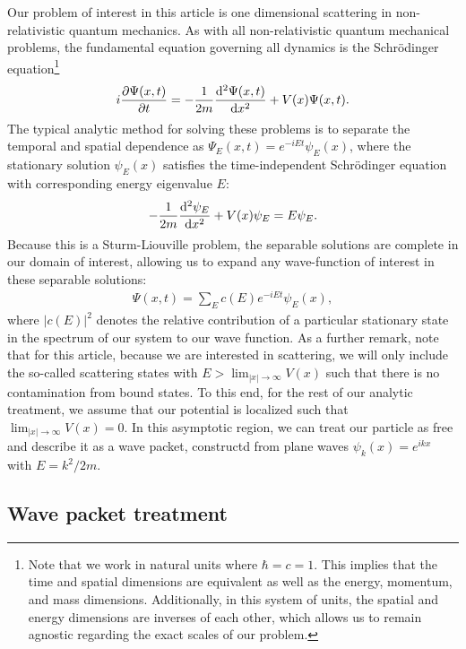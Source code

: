 Our problem of interest in this article is one dimensional scattering in non-relativistic quantum mechanics.
As with all non-relativistic quantum mechanical problems, the fundamental equation governing all dynamics is the Schr\"{o}dinger equation\footnote{Note that we work in natural units where $\hbar = c = 1$. This implies that the time and spatial dimensions are equivalent as well as the energy, momentum, and mass dimensions. Additionally, in this system of units, the spatial and energy dimensions are inverses of each other, which allows us to remain agnostic regarding the exact scales of our problem.}
\begin{align}
\label{eq:td-S-eq}
    i \pdv{\Psi(x,t)}{t} = -\frac{1}{2m} \dv[2]{\Psi(x,t)}{x} + V(x) \Psi(x,t)
.\end{align}
The typical analytic method for solving these problems is to separate the temporal and spatial dependence as $\Psi_{E}(x,t) = e^{- i E t} \psi_{E}(x)$, where the stationary solution $\psi_{E}(x)$ satisfies the time-independent Schr\"{o}dinger equation with corresponding energy eigenvalue $E$:
\begin{align}
\label{eq:ti-S-eq}
    -\frac{1}{2m} \dv[2]{\psi_{E}}{x} + V(x) \psi_{E} = E \psi_{E}
.\end{align}
Because this is a Sturm-Liouville problem, the separable solutions are complete in our domain of interest, allowing us to expand any wave-function of interest in these separable solutions:
\begin{align}
\label{eq:psi-expansion}
    \Psi(x,t) = \sum_{E} c(E) e^{-i E t} \psi_{E}(x)
,\end{align}
where $|c(E)|^2$ denotes the relative contribution of a particular stationary state in the spectrum of our system to our wave function.
As a further remark, note that for this article, because we are interested in scattering, we will only include the so-called scattering states with $E > \lim_{|x| \rightarrow \infty} V(x)$ such that there is no contamination from bound states.
To this end, for the rest of our analytic treatment, we assume that our potential is localized such that $\lim_{|x| \rightarrow \infty} V(x) = 0$.
In this asymptotic region, we can treat our particle as free and describe it as a wave packet, constructd from plane waves $\psi_{k}(x) = e^{i k x}$ with $E = k^2 / 2m$.

\subsection{Wave packet treatment}
\label{ssec:wave-packet-treatment}


